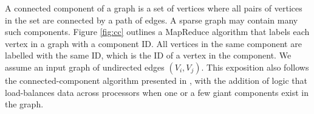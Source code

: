 A connected component of a graph is a set of vertices where all pairs
of vertices in the set are connected by a path of edges.  A sparse
graph may contain many such components.  Figure \ref{fig:cc} outlines
a MapReduce algorithm that labels each vertex in a graph with a
component ID.  All vertices in the same component are labelled with
the same ID, which is the ID of a vertex in the component.  We assume
an input graph of undirected edges $(V_i,V_j)$.  This exposition also
follows the connected-component algorithm presented in \cite{Cohen},
with the addition of logic that load-balances data across processors
when one or a few giant components exist in the graph.

\begin{figure}[htb]
 \begin{center}
\end{center}
\end{figure}

